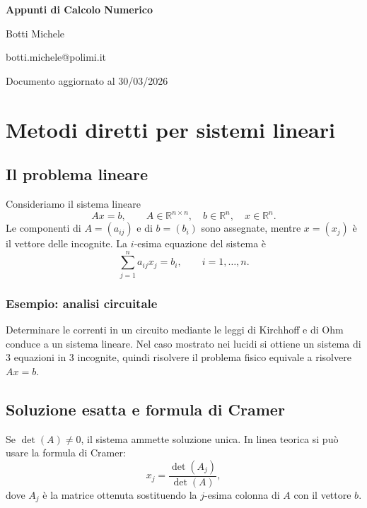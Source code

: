 \documentclass[11pt,a4paper]{report}
\newcommand{\R}{\mathbb{R}}
\begin{document}
\begin{titlepage}
\thispagestyle{empty}
\begin{center}
\vspace*{4.5cm}

{\LARGE\bfseries Appunti di Calcolo Numerico\par}
\vspace{0.9cm}
{\Large Botti Michele\par}
\vspace{0.35cm}
{\large botti.michele@polimi.it\par}

\vfill

{\large Documento aggiornato al 30/03/2026\par}
\end{center}
\end{titlepage}



\tableofcontents
\clearpage

\chapter{Metodi diretti per sistemi lineari}

\section{Il problema lineare}
Consideriamo il sistema lineare
\[
Ax=b,
\qquad A\in\R^{n\times n},\quad b\in\R^n,
\quad x\in\R^n.
\]
Le componenti di $A=(a_{ij})$ e di $b=(b_i)$ sono assegnate, mentre $x=(x_j)$ \`e il vettore delle incognite.
La $i$-esima equazione del sistema \`e
\[
\sum_{j=1}^n a_{ij}x_j=b_i,
\qquad i=1,\dots,n.
\]

\subsection{Esempio: analisi circuitale}
Determinare le correnti in un circuito mediante le leggi di Kirchhoff e di Ohm conduce a un sistema lineare.
Nel caso mostrato nei lucidi si ottiene un sistema di $3$ equazioni in $3$ incognite,
quindi risolvere il problema fisico equivale a risolvere $Ax=b$.

\section{Soluzione esatta e formula di Cramer}
Se $\det(A)\neq 0$, il sistema ammette soluzione unica. In linea teorica si pu\`o usare la formula di Cramer:
\[
 x_j=\frac{\det(A_j)}{\det(A)},
\]
dove $A_j$ \`e la matrice ottenuta sostituendo la $j$-esima colonna di $A$ con il vettore $b$.
\end{document}

